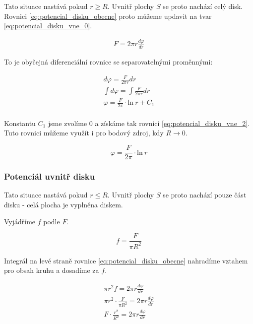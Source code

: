 \documentclass{book}
\begin{document}
Tato situace nastává pokud \(r \geq R\). Uvnitř plochy \(S\) se proto nachází celý disk. Rovnici \eqref{eq:potencial_disku_obecne} proto můžeme updavit na tvar \eqref{eq:potencial_disku_vne_0}.

\begin{equation}
\label{eq:potencial_disku_vne_0}
\begin{split}
F = 2 \pi r \frac{d \varphi}{dr}
\end{split}
\end{equation}

To je obyčejná diferenciální rovnice se separovatelnými proměnnými:

\begin{equation}
\label{eq:potencial_disku_vne_1}
\begin{split}
d \varphi = \frac{F}{2 \pi r} dr \\
\int d \varphi = \int \frac{F}{2 \pi r} dr \\
\varphi = \frac{F}{2 \pi} \cdot \mathrm{ln} \ r + C_1 \\
\end{split}
\end{equation}

Konstantu \(C_1\) jsme zvolíme 0 a získáme tak rovnici \eqref{eq:potencial_disku_vne_2}. Tuto rovnici můžeme využít i pro bodový zdroj, kdy \(R \rightarrow 0\).

\begin{equation}
\label{eq:potencial_disku_vne_2}
\varphi = \frac{F}{2 \pi} \cdot \mathrm{ln} \ r
\end{equation}

\subsubsection{Potenciál uvnitř disku}

Tato situace nastává pokud \(r \leq R\). Uvnitř plochy \(S\) se proto nachází pouze část disku - celá plocha je vyplněna diskem.

Vyjádříme \(f\) podle \(F\).

\begin{equation}
f = \frac{F}{\pi R^2}
\end{equation}

Integrál na levé straně rovnice \eqref{eq:potencial_disku_obecne} nahradíme vztahem pro obsah kruhu a dosadíme za \(f\).

\begin{equation}
\begin{split}
\pi r^2 f = 2 \pi r \frac{d \varphi}{dr} \\
\pi r^2 \cdot \frac{F}{\pi R^2} = 2 \pi r \frac{d \varphi}{dr} \\
F \cdot \frac{r^2}{R^2} = 2 \pi r \frac{d \varphi}{dr}
\end{split}
\end{equation}
\end{document}

